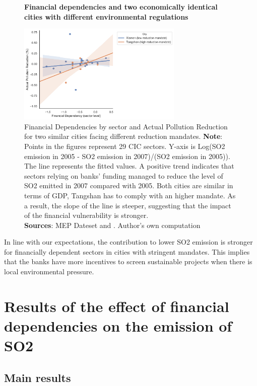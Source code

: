\documentclass[12pt]{article}
\begin{document}
\begin{figure}[ht]
    \centering
    \textbf{Financial dependencies and two economically identical cities with different environmental regulations}\par\medskip
    \includegraphics[width=0.7\textwidth]{fig_4.jpg}
    \caption{
    \small
    Financial Dependencies by sector and Actual Pollution Reduction for two similar cities facing different reduction mandates.
    \textbf{Note}: Points in the figures represent 29 CIC sectors. Y-axis is Log(SO2 emission in 2005 - SO2 emission in 2007)/(SO2 emission in 2005)). The line represents the fitted values. A positive trend indicates that sectors relying on banks’ funding managed to reduce the level of SO2 emitted in 2007 compared with 2005. Both cities are similar in terms of GDP, Tangshan has to comply with an higher mandate. As a result, the slope of the line is steeper, suggesting that the impact of the financial vulnerability is stronger.\\
    \textbf{Sources}: MEP Dateset and \cite{Fan2015-bm}. Author's own computation
    }
    \label{fig:figure4}
\end{figure}

In line with our expectations, the contribution to lower SO2 emission is stronger for financially dependent sectors in cities with stringent mandates. This implies that the banks have more incentives to screen sustainable projects when there is local environmental pressure.

\section{Results of the effect of financial dependencies on the emission of SO2} \label{sec:result}

\subsection{Main results}
\end{document}
